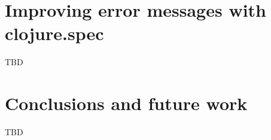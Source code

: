 \documentclass[12pt]{article}
\newcommand{\comment}[1]{}
\newcommand{\emcomment}[1]{\textcolor{ForestGreen}{\comment{Elena: {#1}}}}
\begin{document}
\section*{\centering Improving error messages with clojure.spec}
TBD

\section*{\centering Conclusions and future work}
TBD





\end{document}
